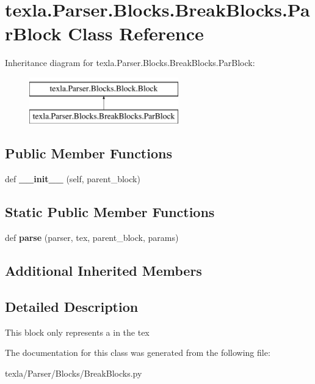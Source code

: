 \hypertarget{classtexla_1_1Parser_1_1Blocks_1_1BreakBlocks_1_1ParBlock}{}\section{texla.\+Parser.\+Blocks.\+Break\+Blocks.\+Par\+Block Class Reference}
\label{classtexla_1_1Parser_1_1Blocks_1_1BreakBlocks_1_1ParBlock}
Inheritance diagram for texla.\+Parser.\+Blocks.\+Break\+Blocks.\+Par\+Block\+:\begin{figure}[H]
\begin{center}
\leavevmode
\includegraphics[height=2.000000cm]{classtexla_1_1Parser_1_1Blocks_1_1BreakBlocks_1_1ParBlock}
\end{center}
\end{figure}
\subsection*{Public Member Functions}
\begin{DoxyCompactItemize}
\item 
\hypertarget{classtexla_1_1Parser_1_1Blocks_1_1BreakBlocks_1_1ParBlock_a23a2ed3e8b2828fe3a4399c18f430280}{}\label{classtexla_1_1Parser_1_1Blocks_1_1BreakBlocks_1_1ParBlock_a23a2ed3e8b2828fe3a4399c18f430280} 
def {\bfseries \+\_\+\+\_\+init\+\_\+\+\_\+} (self, parent\+\_\+block)
\end{DoxyCompactItemize}
\subsection*{Static Public Member Functions}
\begin{DoxyCompactItemize}
\item 
\hypertarget{classtexla_1_1Parser_1_1Blocks_1_1BreakBlocks_1_1ParBlock_a9381ac510036f85bfe5161db586af907}{}\label{classtexla_1_1Parser_1_1Blocks_1_1BreakBlocks_1_1ParBlock_a9381ac510036f85bfe5161db586af907} 
def {\bfseries parse} (parser, tex, parent\+\_\+block, params)
\end{DoxyCompactItemize}
\subsection*{Additional Inherited Members}


\subsection{Detailed Description}
\begin{DoxyVerb}This block only represents a \n\n in the tex\end{DoxyVerb}
 

The documentation for this class was generated from the following file\+:\begin{DoxyCompactItemize}
\item 
texla/\+Parser/\+Blocks/Break\+Blocks.\+py\end{DoxyCompactItemize}
